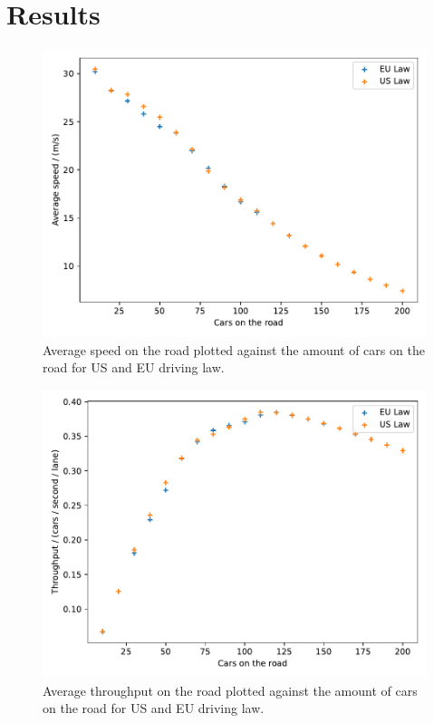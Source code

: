 \section{Results}
\label{sec:results}

\begin{figure}[H]
	\centering
	\includegraphics[width=0.9\linewidth]{media/ave_speed_comparison.pdf}
	\caption{Average speed on the road plotted against the amount of cars on the road for US and EU driving law.}
	\label{fig:speed-cars}
\end{figure}

\begin{figure}[H]
	\centering
	\includegraphics[width=0.9\linewidth]{media/throughput_cars.pdf}
	\caption{Average throughput on the road plotted against the amount of cars on the road for US and EU driving law.}
	\label{fig:throughput-cars}
\end{figure}

